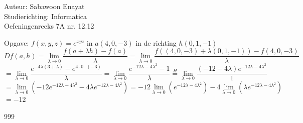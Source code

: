 \documentclass[a4paper]{article}
\begin{document}
  
\noindent \large Auteur: Sabawoon Enayat      \\
\noindent \large Studierichting: Informatica  \\
\noindent \large Oefeningenreeks 7A nr. 12.12 \\

\newcommand{\llim}{\lim\limits}

\medskip

\normalsize

Opgave: $f(x, y, z) = e^{xyz}$ in $a(4, 0, -3)$ in de richting $h(0, 1, -1)$\\

$Df(a, h) = \llim_{\lambda \to 0} \dfrac{f(a + \lambda h) - f(a)}{\lambda} = \llim_{\lambda \to 0} \dfrac{f((4, 0, -3) + \lambda (0, 1, -1)) - f(4, 0, -3)}{\lambda}$\\

$= \llim_{\lambda \to 0} \dfrac{e^{-4\lambda(3+\lambda)} - e^{4 \cdot 0 \cdot (-3)}}{\lambda} = \llim_{\lambda \to 0} \dfrac{e^{-12\lambda - 4\lambda^2} - 1}{\lambda} \overset{H}{=} \llim_{\lambda \to 0} \dfrac{(-12 - 4\lambda)e^{-12\lambda - 4\lambda^2}}{1}$\\

$= \llim_{\lambda \to 0} (-12e^{-12\lambda - 4\lambda^2} - 4\lambda e^{-12\lambda - 4\lambda^2}) = -12\llim_{\lambda \to 0} (e^{-12\lambda - 4\lambda^2}) - 4\llim_{\lambda \to 0} (\lambda e^{-12\lambda - 4\lambda^2})$\\

$= -12$\\

\begin{thebibliography}{999}
\end{thebibliography}
\end{document}
